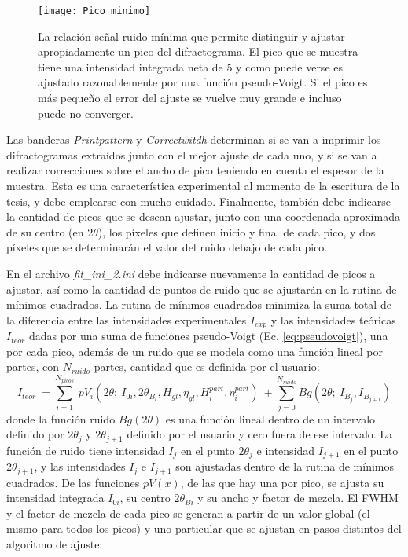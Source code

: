 \begin{figure}[!htb]
  \centering
  \texttt{[image: Pico\_minimo]}
  \caption{La relación señal ruido mínima que permite distinguir y ajustar apropiadamente un pico del difractograma. El pico que se muestra tiene una intensidad integrada neta de 5 y como puede verse es ajustado razonablemente por una función pseudo-Voigt. Si el pico es más pequeño el error del ajuste se vuelve muy grande e incluso puede no converger.}
  \label{fig:MinIntensity}
\end{figure}

Las banderas \textit{Printpattern} y \textit{Correctwitdh} determinan si se van a imprimir los difractogramas extraídos junto con el mejor ajuste de cada uno, y si se van a realizar correcciones sobre el ancho de pico teniendo en cuenta el espesor de la muestra.
Esta es una característica experimental al momento de la escritura de la tesis, y debe emplearse con mucho cuidado.
Finalmente, también debe indicarse la cantidad de picos que se desean ajustar, junto con una coordenada aproximada de su centro (en 2$\theta$), los píxeles que definen inicio y final de cada pico, y dos píxeles que se determinarán el valor del ruido debajo de cada pico.

En el archivo \hypertarget{fitini}{\textit{fit\_ini\_2.ini}} debe indicarse nuevamente la cantidad de picos a ajustar, así como la cantidad de puntos de ruido que se ajustarán en la rutina de mínimos cuadrados.
La rutina de mínimos cuadrados minimiza la suma total de la diferencia entre las intensidades experimentales $I_{exp}$ y las intensidades teóricas $I_{teor}$ dadas por una suma de funciones pseudo-Voigt (Ec. \ref{eq:pseudovoigt}), una por cada pico, además de un ruido que se modela como una función lineal por partes, con $N_{ruido}$ partes, cantidad que es definida por el usuario:
\begin{equation}
  I_{teor} \ = \sum_{i=1}^{N_{picos}} \ pV_i (2\theta; \ I_{0i}, 2\theta_{B_i}, H_{gl}, \eta_{gl}, H_i^{part}, \eta_i^{part}) \ + \sum_{j=0}^{N_{ruido}} Bg(2\theta; \ I_{B_j}, I_{B_{j+1}})
  \label{eq:Iteor}
\end{equation}
\noindent
donde la función ruido $Bg(2\theta)$ es una función lineal dentro de un intervalo definido por $2\theta_j$ y $2\theta_{j+1}$ definido por el usuario y cero fuera de ese intervalo.
La función de ruido tiene intensidad $I_j$ en el punto $2\theta_j$ e intensidad $I_{j+1}$ en el punto $2\theta_{j+1}$, y las intensidades $I_j$ e $I_{j+1}$ son ajustadas dentro de la rutina de mínimos cuadrados.
De las funciones $pV(x)$, de las que hay una por pico, se ajusta su intensidad integrada $I_{0i}$, su centro $2\theta_{Bi}$ y su ancho y factor de mezcla.
El FWHM y el factor de mezcla de cada pico se generan a partir de un valor global (el mismo para todos los picos) y uno particular que se ajustan en pasos distintos del algoritmo de ajuste:

